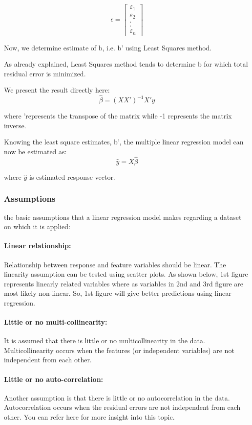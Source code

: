 $$\epsilon = 
\begin{bmatrix} 
\varepsilon_1\\  \varepsilon_2\\  .\\  .\\  \varepsilon_n 
\end{bmatrix}
$$ 

Now, we determine estimate of b, i.e. b' using Least Squares method.

As already explained, Least Squares method tends to determine b for which total residual error is minimized.

We present the result directly here:
$$\hat{\beta} = (XX')^{-1} {X}'y $$

where 'represents the transpose of the matrix while -1 represents the matrix inverse.

Knowing the least square estimates, b', the multiple linear regression model can now be estimated as:
$$\hat{y} = X\hat{\beta}$$

where $\hat{y}$ is estimated response vector.

\subsubsection{Assumptions}
the basic assumptions that a linear regression model makes regarding a dataset on which it is applied:

\paragraph{Linear relationship:}
Relationship between response and feature variables should be linear. The linearity assumption can be tested using scatter plots. As shown below, 1st figure represents linearly related variables where as variables in 2nd and 3rd figure are most likely non-linear. So, 1st figure will give better predictions using linear regression.

\paragraph{Little or no multi-collinearity:}
It is assumed that there is little or no multicollinearity in the data. Multicollinearity occurs when the features (or independent variables) are not independent from each other.

\paragraph{Little or no auto-correlation:}
Another assumption is that there is little or no autocorrelation in the data. Autocorrelation occurs when the residual errors are not independent from each other. You can refer here for more insight into this topic.

